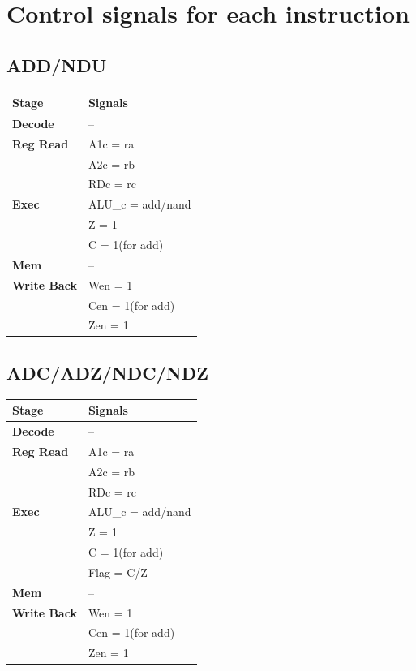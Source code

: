 \documentclass{article}
\begin{document}
\section*{Control signals for each instruction}
\subsection*{ADD/NDU}

\begin{tabular}{|l|l|}
\hline
\textbf{Stage} & \textbf{Signals}\\
\hline
\textbf{Decode} & --\\
\hline
\textbf{Reg Read} & A1c = ra \\
                  & A2c = rb \\
                  & RDc = rc \\ 
\hline
\textbf{Exec} & ALU\_c = add/nand\\
              & Z = 1\\
              & C = 1(for add)\\  
\hline
\textbf{Mem} & --\\
\hline
\textbf{Write Back} & Wen = 1\\
                    & Cen = 1(for add)\\
                    & Zen = 1\\
\hline
\end{tabular}

\subsection*{ADC/ADZ/NDC/NDZ}
\begin{tabular}{|l|l|}
\hline
\textbf{Stage} & \textbf{Signals}\\
\hline
\textbf{Decode} & --\\
\hline
\textbf{Reg Read} & A1c = ra \\
                  & A2c = rb \\
                  & RDc = rc \\ 
\hline
\textbf{Exec} & ALU\_c = add/nand\\
              & Z = 1\\
              & C = 1(for add)\\
              & Flag = C/Z\\
\hline
\textbf{Mem} & --\\
\hline
\textbf{Write Back} & Wen = 1\\
                    & Cen = 1(for add)\\
                    & Zen = 1\\
\hline
\end{tabular}
\end{document}
